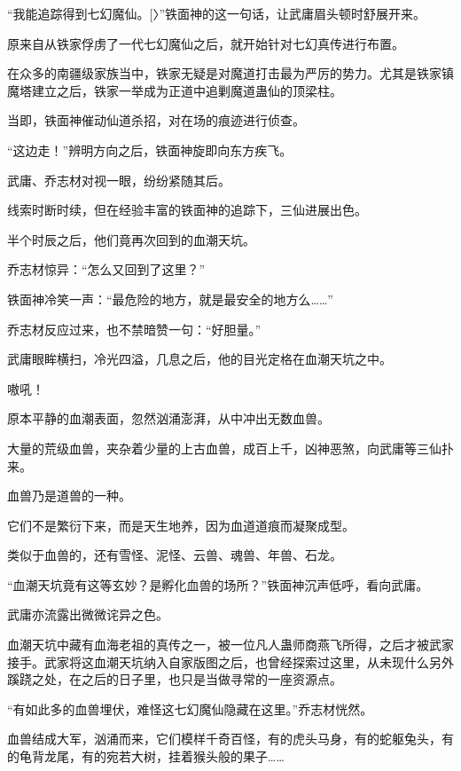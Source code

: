 
\begin{this_body}



“我能追踪得到七幻魔仙。[〉”铁面神的这一句话，让武庸眉头顿时舒展开来。

原来自从铁家俘虏了一代七幻魔仙之后，就开始针对七幻真传进行布置。

在众多的南疆级家族当中，铁家无疑是对魔道打击最为严厉的势力。尤其是铁家镇魔塔建立之后，铁家一举成为正道中追剿魔道蛊仙的顶梁柱。

当即，铁面神催动仙道杀招，对在场的痕迹进行侦查。

“这边走！”辨明方向之后，铁面神旋即向东方疾飞。

武庸、乔志材对视一眼，纷纷紧随其后。

线索时断时续，但在经验丰富的铁面神的追踪下，三仙进展出色。

半个时辰之后，他们竟再次回到的血潮天坑。

乔志材惊异：“怎么又回到了这里？”

铁面神冷笑一声：“最危险的地方，就是最安全的地方么……”

乔志材反应过来，也不禁暗赞一句：“好胆量。”

武庸眼眸横扫，冷光四溢，几息之后，他的目光定格在血潮天坑之中。

嗷吼！

原本平静的血潮表面，忽然汹涌澎湃，从中冲出无数血兽。

大量的荒级血兽，夹杂着少量的上古血兽，成百上千，凶神恶煞，向武庸等三仙扑来。

血兽乃是道兽的一种。

它们不是繁衍下来，而是天生地养，因为血道道痕而凝聚成型。

类似于血兽的，还有雪怪、泥怪、云兽、魂兽、年兽、石龙。

“血潮天坑竟有这等玄妙？是孵化血兽的场所？”铁面神沉声低呼，看向武庸。

武庸亦流露出微微诧异之色。

血潮天坑中藏有血海老祖的真传之一，被一位凡人蛊师商燕飞所得，之后才被武家接手。武家将这血潮天坑纳入自家版图之后，也曾经探索过这里，从未现什么另外蹊跷之处，在之后的日子里，也只是当做寻常的一座资源点。

“有如此多的血兽埋伏，难怪这七幻魔仙隐藏在这里。”乔志材恍然。

血兽结成大军，汹涌而来，它们模样千奇百怪，有的虎头马身，有的蛇躯兔头，有的龟背龙尾，有的宛若大树，挂着猴头般的果子……


\end{this_body}

